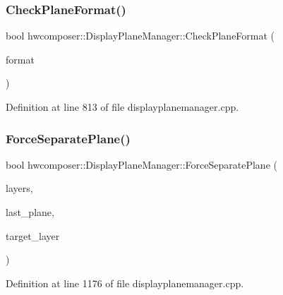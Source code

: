 \subsubsection{\texorpdfstring{Check\+Plane\+Format()}{CheckPlaneFormat()}}
{\footnotesize\ttfamily bool hwcomposer\+::\+Display\+Plane\+Manager\+::\+Check\+Plane\+Format (\begin{DoxyParamCaption}\item[{uint32\+\_\+t}]{format }\end{DoxyParamCaption})}



Definition at line 813 of file displayplanemanager.\+cpp.


\begin{DoxyCode}{0}
\end{DoxyCode}
\mbox{\label{classhwcomposer_1_1DisplayPlaneManager_afd4d9af275a937a7afa49a1d37ab0063}} 
\subsubsection{\texorpdfstring{Force\+Separate\+Plane()}{ForceSeparatePlane()}}
{\footnotesize\ttfamily bool hwcomposer\+::\+Display\+Plane\+Manager\+::\+Force\+Separate\+Plane (\begin{DoxyParamCaption}\item[{const std\+::vector$<$ \mbox{\hyperlink{structhwcomposer_1_1OverlayLayer}{Overlay\+Layer}} $>$ \&}]{layers,  }\item[{const \mbox{\hyperlink{classhwcomposer_1_1DisplayPlaneState}{Display\+Plane\+State}} \&}]{last\+\_\+plane,  }\item[{const \mbox{\hyperlink{structhwcomposer_1_1OverlayLayer}{Overlay\+Layer}} $\ast$}]{target\+\_\+layer }\end{DoxyParamCaption})}



Definition at line 1176 of file displayplanemanager.\+cpp.


